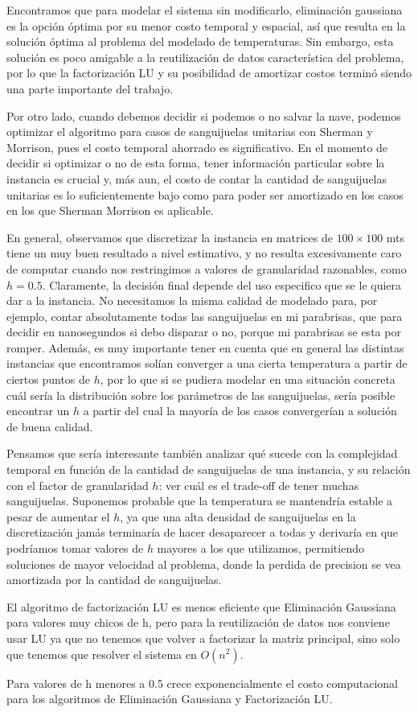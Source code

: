 Encontramos que para modelar el sistema sin modificarlo, eliminación gaussiana es la opción óptima por su menor costo temporal y espacial, así que resulta en la solución óptima al problema del modelado de temperaturas. Sin embargo, esta solución es poco amigable a la reutilización de datos característica del problema, por lo que la factorización LU y su posibilidad de amortizar costos terminó siendo una parte importante del trabajo.

Por otro lado, cuando debemos decidir si podemos o no salvar la nave, podemos optimizar el algoritmo para casos de sanguijuelas unitarias con Sherman y Morrison, pues el costo temporal ahorrado es significativo. En el momento de decidir si optimizar o no de esta forma, tener información particular sobre la instancia es crucial y, más aun, el costo de contar la cantidad de sanguijuelas unitarias es lo suficientemente bajo como para poder ser amortizado en los casos en los que Sherman Morrison es aplicable.

En general, observamos que discretizar la instancia en matrices de $100 \times 100$ mts tiene un muy buen resultado a nivel estimativo, y no resulta excesivamente caro de computar cuando nos restringimos a valores de granularidad razonables, como $h = 0.5$. Claramente, la decisión final depende del uso especifico que se le quiera dar a la instancia. No necesitamos la misma calidad de modelado para, por ejemplo, contar absolutamente todas las sanguijuelas en mi parabrisas, que para decidir en nanosegundos si debo disparar o no, porque mi parabrisas se esta por romper. Además, es muy importante tener en cuenta que en general las distintas instancias que encontramos solían converger a una cierta temperatura a partir de ciertos puntos de $h$, por lo que si se pudiera modelar en una situación concreta cuál sería la distribución sobre los parámetros de las sanguijuelas, sería posible encontrar un $h$ a partir del cual la mayoría de los casos convergerían a solución de buena calidad.

Pensamos que sería interesante también analizar qué sucede con la complejidad temporal en función de la cantidad de sanguijuelas de una instancia, y su relación con el factor de granularidad $h$: ver cuál es el trade-off de tener muchas sanguijuelas. Suponemos probable que la temperatura se mantendría estable a pesar de aumentar el $h$, ya que una alta densidad de sanguijuelas en la discretización jamás terminaría de hacer desaparecer a todas y derivaría en que podríamos tomar valores de $h$ mayores a los que utilizamos, permitiendo soluciones de mayor velocidad al problema, donde la perdida de precision se vea amortizada por la cantidad de sanguijuelas.

El algoritmo de factorización LU es menos eficiente que Eliminación Gaussiana para valores muy chicos de h, pero para la reutilización de datos nos conviene usar LU ya que no tenemos que volver a factorizar la matriz principal, sino solo que tenemos que resolver el sistema en $O(n^2)$. 

Para valores de h menores a 0.5 crece exponencialmente el costo computacional para los algoritmos de Eliminación Gaussiana y Factorización LU. 
